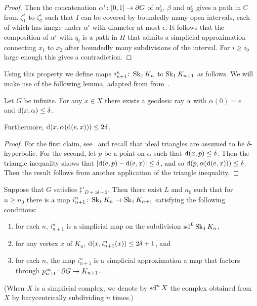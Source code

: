 \documentclass[a4paper]{article}
\begin{document}
\begin{proof}
  Then the concatenation $\alpha^i\colon[0,1]\to \partial G$ of $\alpha_1^i$,
  $\beta$ and $\alpha_2^i$ gives a path in $C$ from $\zeta_1^i$ to $\zeta_2^i$
  such that $I$ can be covered by boundedly many open intervals, each of which
  has image under $\alpha^i$ with diameter at most $\epsilon$. It follows that
  the composition of $\alpha^i$ with $q_i$ is a path in $H$ that admits a
  simplicial approximation connecting $x_1$ to $x_2$ after boundedly many
  subdivisions of the interval. For $i \geq i_0$ large enough this gives a
  contradiction.
\end{proof}

Using this property we define maps $i^n_{n+1}\colon \operatorname{Sk}_1 K_n$ to
$\operatorname{Sk}_1K_{n+1}$ as follows.  We will make use of the following lemma, adapted
from from~\cite{bestvinamess91}.

\begin{lemma}\cite{bestvinamess91}\label{lem:near_geod_rays}
  Let $G$ be infinite. For any $x \in X$ there exists a geodesic ray $\alpha$ 
  with $\alpha(0) = e$ and $\operatorname{d}(x,\alpha) \leq \delta$. 
  
  Furthermore, $\operatorname{d}(x, \alpha(\operatorname{d}(e,x))) \leq 2\delta$.
\end{lemma}

\begin{proof}
  For the first claim, see~\cite{bestvinamess91} and recall that ideal
  triangles are assumed to be $\delta$-hyperbolic. For the second, let $p$ be
  a point on $\alpha$ such that $\operatorname{d}(x, p) \leq \delta$. Then the triangle
  inequality shows that $\left|\operatorname{d}(e,p) - \operatorname{d}(e,x)\right| \leq \delta$, and so
  $\operatorname{d}(p, \alpha(\operatorname{d}(e,x))) \leq \delta$. Then the result follows from
  another application of the triangle inequality.
\end{proof}

\begin{proposition}\label{prop:i_in_dimension_1}
  Suppose that $G$ satisfies $\ddag'_{D + 4\delta+2}$. Then there exist $L$ and
  $n_0$ such that for $n\geq n_0$ there is a map $i^n_{n+1}\colon \operatorname{Sk}_1 K_n
  \to \operatorname{Sk}_1 K_{n+1}$ satisfying the following conditions:
  \begin{enumerate}
    \item for each $n$, $i^n_{n+1}$ is a simplicial map on the subdivision
      $\operatorname{sd}^L\operatorname{Sk}_1 K_n$,
    \item for any vertex $x$ of $K_n$, $\operatorname{d}(x, i^n_{n+1}(x)) \leq 2\delta+1$,
      and
    \item for each $n$, the map $i^n_{n+1}$ is a simplicial approximation a map
      that factors through $p^\infty_{n+1}\colon \partial G \to K_{n+1}$.
  \end{enumerate}
  (When $X$ is a simplicial complex, we denote by $\operatorname{sd}^n X$ the complex
  obtained from $X$ by barycentrically subdividing $n$ times.)
\end{proposition}
\end{document}
